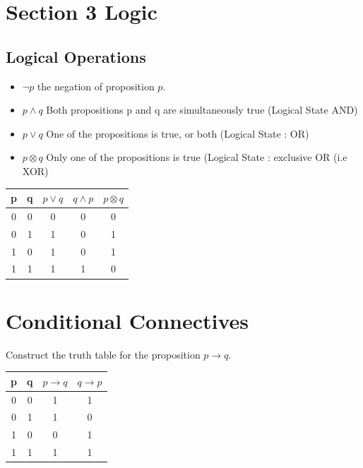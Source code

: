 \documentclass[]{report}
\begin{document}
\newpage
\section{Section 3 Logic}
\subsection{Logical Operations}
\begin{itemize}
\item $\neg p$ the negation of proposition $p$.
\item $p \wedge q$ Both propositions p and q are simultaneously true (Logical State AND)
\item $p \vee q $ One of the propositions is true, or both (Logical State : OR)
\item $p \otimes q$ Only one of the propositions is true (Logical State : exclusive OR (i.e XOR)
\end{itemize}
\begin{center}
\begin{tabular}{|c|c|c|c|c|}
\hline
p & q & $p \vee q$ & $q \wedge p$ & $p \otimes q$ \\
\hline
0 & 0 & 0 & 0 & 0 \\
0 & 1 & 1 & 0 & 1\\
1 & 0 & 1 & 0 & 1 \\
1 & 1 & 1 & 1 & 0\\
\hline
\end{tabular}
\end{center}
\section{Conditional Connectives}
Construct the truth table for the proposition $p \rightarrow q$.

\begin{center}
\begin{tabular}{|c|c|c|c|}
\hline
p & q & $p \rightarrow q$ & $q \rightarrow p$ \\
\hline
0 & 0 & 1& 1 \\
0 & 1 & 1 & 0 \\
1 & 0 & 0 & 1 \\
1 & 1 & 1 & 1 \\
\hline
\end{tabular}
\end{center}
\end{document}

